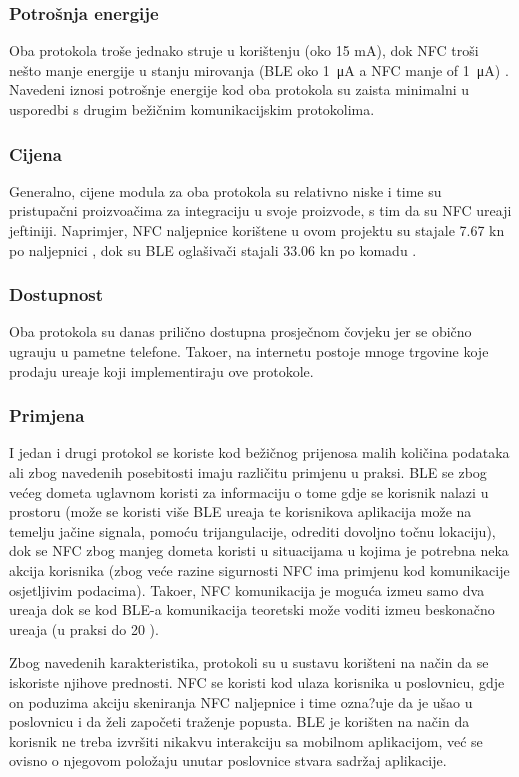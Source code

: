 \subsubsection{Potro\v{s}nja energije}
Oba protokola tro\v{s}e jednako struje u kori\v{s}tenju (oko 15 mA), dok NFC tro\v{s}i ne\v{s}to manje energije u stanju mirovanja (BLE oko \SI{1}{\micro\ampere} a NFC manje of \SI{1}{\micro\ampere}) \cite{mobilePayments}. Navedeni iznosi potro\v{s}nje energije kod oba protokola su zaista minimalni u usporedbi s drugim be\v{z}i\v{c}nim komunikacijskim protokolima.


\subsubsection{Cijena}
Generalno, cijene modula za oba protokola su relativno niske i time su pristupa\v{c}ni proizvo\dj a\v{c}ima za integraciju u svoje proizvode, s tim da su NFC ure\dj aji jeftiniji. Naprimjer, NFC naljepnice kori\v{s}tene u ovom projektu su stajale 7.67 kn po naljepnici \cite{whiztags}, dok su BLE ogla\v{s}iva\v{c}i stajali 33.06 kn po komadu \cite{gimbal_beacon}.

\subsubsection{Dostupnost}
Oba protokola su danas prili\v{c}no dostupna prosje\v{c}nom \v{c}ovjeku jer se obi\v{c}no ugra\dj uju u pametne telefone. Tako\dj er, na internetu postoje mnoge trgovine koje prodaju ure\dj aje koji implementiraju ove protokole.

\subsubsection{Primjena}
I jedan i drugi protokol se koriste kod be\v{z}i\v{c}nog prijenosa malih koli\v{c}ina podataka ali zbog navedenih posebitosti imaju razli\v{c}itu primjenu u praksi. BLE se zbog ve\'{c}eg dometa uglavnom koristi za informaciju o tome gdje se korisnik nalazi u prostoru (mo\v{z}e se koristi vi\v{s}e BLE ure\dj aja te korisnikova aplikacija mo\v{z}e na temelju ja\v{c}ine signala, pomo\'{c}u trijangulacije, odrediti dovoljno to\v{c}nu lokaciju), dok se NFC zbog manjeg dometa koristi u situacijama u kojima je potrebna neka akcija korisnika (zbog ve\'{c}e razine sigurnosti NFC ima primjenu kod komunikacije osjetljivim podacima). Tako\dj er, NFC komunikacija je mogu\'{c}a izme\dj u samo dva ure\dj aja dok se kod BLE-a komunikacija teoretski mo\v{z}e voditi izme\dj u beskona\v{c}no ure\dj aja (u praksi do 20 \cite{mobilePayments}). 

Zbog navedenih karakteristika, protokoli su u sustavu kori\v{s}teni na na\v{c}in da se iskoriste njihove prednosti. NFC se koristi kod ulaza korisnika u poslovnicu, gdje on poduzima akciju skeniranja NFC naljepnice i time ozna?uje da je u\v{s}ao u poslovnicu i da \v{z}eli zapo\v{c}eti tra\v{z}enje popusta. BLE je kori\v{s}ten na na\v{c}in da korisnik ne treba izvr\v{s}iti nikakvu interakciju sa mobilnom aplikacijom, ve\'{c} se ovisno o njegovom polo\v{z}aju unutar poslovnice stvara sadr\v{z}aj aplikacije.







